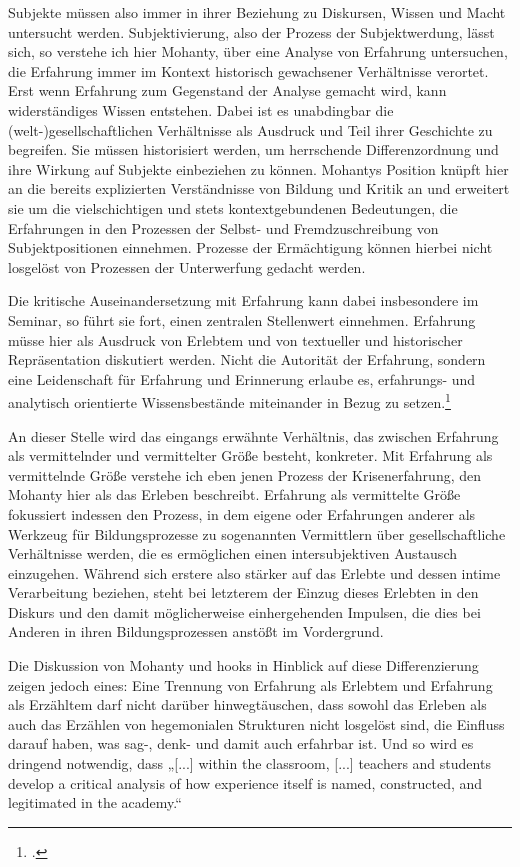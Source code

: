 Subjekte müssen also immer in ihrer Beziehung zu Diskursen, Wissen und Macht
untersucht werden. Subjektivierung, also der Prozess der Subjektwerdung, lässt
sich, so verstehe ich hier Mohanty, über eine Analyse von Erfahrung
untersuchen, die Erfahrung immer im Kontext historisch gewachsener Verhältnisse
verortet. Erst wenn Erfahrung zum Gegenstand der Analyse gemacht wird, kann
widerständiges Wissen entstehen. Dabei ist es unabdingbar die
(welt-)gesellschaftlichen Verhältnisse als Ausdruck und Teil ihrer Geschichte
zu begreifen. Sie müssen historisiert werden, um herrschende Differenzordnung
und ihre Wirkung auf Subjekte einbeziehen zu können. Mohantys Position knüpft
hier an die bereits explizierten Verständnisse von Bildung und Kritik an und
erweitert sie um die vielschichtigen und stets kontextgebundenen Bedeutungen,
die Erfahrungen in den Prozessen der Selbst- und Fremdzuschreibung von
Subjektpositionen einnehmen. Prozesse der Ermächtigung können hierbei nicht
losgelöst von Prozessen der Unterwerfung gedacht werden. 

Die kritische Auseinandersetzung mit Erfahrung kann dabei insbesondere im
Seminar, so führt sie fort, einen zentralen Stellenwert einnehmen. Erfahrung
müsse hier als Ausdruck von Erlebtem und von textueller und historischer
Repräsentation diskutiert werden. Nicht die Autorität der Erfahrung, sondern
eine Leidenschaft für Erfahrung und Erinnerung erlaube es, erfahrungs- und
analytisch orientierte Wissensbestände miteinander in Bezug zu
setzen.\footnotemark\footcitetext{bellhooks}

An dieser Stelle wird das eingangs erwähnte Verhältnis, das zwischen Erfahrung
als vermittelnder und vermittelter Größe besteht, konkreter. Mit Erfahrung als
vermittelnde Größe verstehe ich eben jenen Prozess der Krisenerfahrung, den
Mohanty hier als das Erleben beschreibt. Erfahrung als vermittelte Größe
fokussiert indessen den Prozess, in dem eigene oder Erfahrungen anderer als
Werkzeug für Bildungsprozesse zu sogenannten Vermittlern über gesellschaftliche
Verhältnisse werden, die es ermöglichen einen intersubjektiven Austausch
einzugehen. Während sich erstere also stärker auf das Erlebte und dessen intime
Verarbeitung beziehen, steht bei letzterem der Einzug dieses Erlebten in den
Diskurs und den damit möglicherweise einhergehenden Impulsen, die dies bei
Anderen in ihren Bildungsprozessen anstößt im Vordergrund.

Die Diskussion von Mohanty und hooks in Hinblick auf diese Differenzierung
zeigen jedoch eines: Eine Trennung von Erfahrung als Erlebtem und Erfahrung als
Erzähltem darf nicht darüber hinwegtäuschen, dass sowohl das Erleben als auch
das Erzählen von hegemonialen Strukturen nicht losgelöst sind, die Einfluss
darauf haben, was sag-,  denk- und damit auch erfahrbar ist. Und so wird es
dringend notwendig, dass „[...] within the classroom, [...] teachers and
students develop a critical analysis of how experience itself is named,
constructed, and legitimated in the academy.“\footnotemark{}

